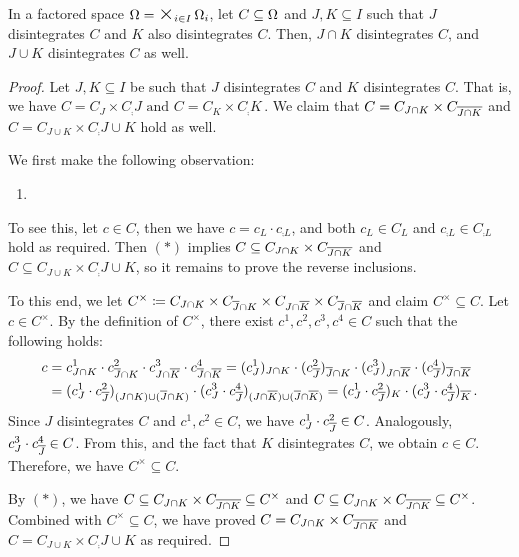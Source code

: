 \documentclass[USenglish,onecolumn]{article}
\begin{document}
\begin{lemma}
\label{lemma:disintegrationintersection}
In a factored space $\FS=\timesbig_\iinI\Omg_i$, let $C\subseteq\Omega$ and $J,K\subseteq I$ such that $J$ disintegrates $C$ and $K$ also disintegrates $C$. Then, $J\cap K$ disintegrates $C$, and $J\cup K$ disintegrates $C$ as well.
\end{lemma}
\begin{proof}
 Let $J,K\subseteq I$ be such that $J$ disintegrates $C$ and $K$ disintegrates $C$. That is, we have
\(C=C_J\times C_\comp{J}\text{ and } C=C_K\times C_\comp{K}\,.\)
We claim that $C= C_{J\cap K}\times C_{\overline{J\cap K}}$ and $C= C_{J\cup K}\times C_\comp{J\cup K}$ hold as well.

We first make the following observation:
\begin{enumerate}
  \item[$(\ast)$]
\end{enumerate}
To see this, let $c\in C$, then we have $c=c_L\cdot c_{\comp{L}}$, and both $c_L\in C_L$ and $c_{\comp{L}}\in C_{\comp{L}}$ hold as required.
Then $(\ast)$ implies $C\subseteq C_{J\cap K}\times C_{\overline{J\cap K}}$ and $C\subseteq C_{J\cup K}\times C_\comp{J\cup K}$, so it remains to prove the reverse inclusions.


To this end, we let $C^\times\coloneqq C_{J\cap K}\times C_{{\overline{J}}\cap K}\times  C_{J\cap {\overline{K}}}\times C_{{\overline{J}}\cap {\overline{K}}}$ and claim $C^\times\subseteq C$.
Let $c\in C^\times$. By the definition of $C^\times$, there exist $c^1, c^2, c^3, c^4\in C$ such that the following holds: 
\begin{align*}
c &= c^1_{J \cap K}  \cdot c^2_{{\overline{J}} \cap K} \cdot c^3_{J \cap {\overline{K}}}\cdot  c^4_{{\overline{J}} \cap {\overline{K}}}
 = (c^1_J)_{J \cap K}  \cdot (c^2_{\overline{J}})_{{\overline{J}} \cap K} \cdot (c^3_J)_{J \cap {\overline{K}}}\cdot  (c^4_{\overline{J}})_{{\overline{J}} \cap {\overline{K}}} \\
 &= (c^1_J\cdot c^2_{\overline{J}})_{(J \cap K)\cup({\overline{J}} \cap K)} \cdot (c^3_J\cdot  c^4_{\overline{J}})_{(J\cap{\overline{K}})\cup({\overline{J}} \cap {\overline{K}})}
= (c^1_{J} \cdot c^2_{\overline{J}})_K \cdot (c^3_J \cdot  c^4_{\overline{J}})_{\overline{K}}\,.
\end{align*}
Since $J$ disintegrates $C$ and $c^1, c^2\in C$, we have $c^1_{J} \cdot c^2_{\overline{J}}\in C$. Analogously, $c^3_J \cdot  c^4_{\overline{J}}\in C$. From this, and the fact that $K$ disintegrates $C$, we obtain $c\in C$. Therefore, we have $C^\times \subseteq C$.

By $(\ast)$, we have
$C\subseteq C_{J\cap K}\times C_{\overline{J\cap K}}\subseteq C^\times$ and
$C\subseteq C_{J\cap K}\times C_{\overline{J\cap K}}\subseteq C^\times$.
Combined with $C^\times \subseteq C$, we have proved $C= C_{J\cap K}\times C_{\overline{J\cap K}}$ and $C= C_{J\cup K}\times C_\comp{J\cup K}$ as required.
\end{proof}
\end{document}
